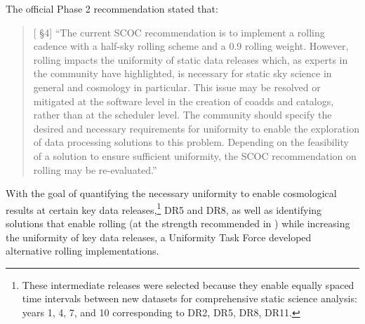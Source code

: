The official Phase 2 recommendation stated that:
\vspace{-0.5cm}
\begin{quote}
     {[ \S4] 
     ``The current SCOC recommendation is to implement a rolling cadence with a half-sky rolling scheme and a 0.9 rolling weight. However, rolling impacts the uniformity of static data releases which, as experts in the community have highlighted, is necessary for static sky science in general and cosmology in particular. This issue may be resolved or mitigated at the software level in the creation of coadds and catalogs, rather than at the scheduler level. The community should specify the desired and necessary requirements for uniformity to enable the exploration of data processing solutions to this problem. Depending on the feasibility of a solution to ensure sufficient uniformity, the SCOC recommendation on rolling may be re-evaluated.'' }

 \end{quote}

 With the goal of quantifying the necessary uniformity to enable cosmological results at certain key data releases,\footnote{These intermediate releases were selected because they enable equally spaced time intervals between new datasets for comprehensive static science analysis: years 1, 4, 7, and 10 corresponding to DR2, DR5, DR8, DR11.} DR5 and DR8, as well as identifying solutions that enable rolling (at the strength recommended in ) while increasing the uniformity of key data releases, a Uniformity Task Force developed alternative rolling implementations. 
 





